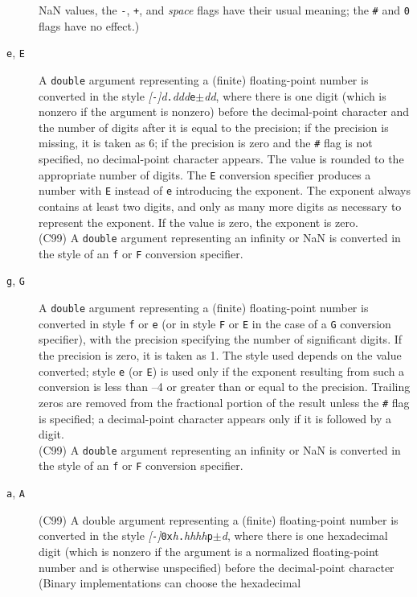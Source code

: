 \begin{description}
NaN values, the \texttt{-}, \texttt{+}, and \emph{space} flags have their usual
meaning; the \texttt{\#} and \texttt{0} flags have no effect.)
	\item[\texttt{e}, \texttt{E}] A \texttt{double} argument representing a
(finite) floating-point number is converted in the style
\emph{[}\texttt{-}\emph{]d}\texttt{.}\emph{ddd}\texttt{e$\pm$}\emph{dd},
where there is one digit (which is nonzero if the argument is nonzero) before
the decimal-point character and the number of digits after it is equal to the
precision; if the precision is missing, it is taken as 6; if the precision is
zero and the \texttt{\#} flag is not specified, no decimal-point character
appears. The value is rounded to the appropriate number of digits. The
\texttt{E} conversion specifier produces a number with \texttt{E} instead of
\texttt{e} introducing the exponent. The exponent always contains at least two
digits, and only as many more digits as necessary to represent the exponent. If
the value is zero, the exponent is zero.\\(C99) A \texttt{double} argument
representing an infinity or NaN is converted in the style of an \texttt{f} or
\texttt{F} conversion specifier.
	\item[\texttt{g}, \texttt{G}] A \texttt{double} argument representing a
(finite) floating-point number is converted in style \texttt{f} or \texttt{e}
(or in style \texttt{F} or \texttt{E} in the case of a \texttt{G} conversion
specifier), with the precision specifying the number of significant digits. If
the precision is zero, it is taken as 1. The style used depends on the value
converted; style \texttt{e} (or \texttt{E}) is used only if the exponent
resulting from such a conversion is less than --4 or greater than or equal to
the precision. Trailing zeros are removed from the fractional portion of the
result unless the \texttt{\#} flag is specified; a decimal-point character
appears only if it is followed by a digit.\\(C99) A \texttt{double} argument
representing an infinity or NaN is converted in the style of an \texttt{f} or
\texttt{F} conversion specifier.
	\item[\texttt{a}, \texttt{A}] (C99) A double argument representing a
(finite) floating-point number is converted in the style
\emph{[}\texttt{-}\emph{]}\texttt{0x}\emph{h}\texttt{.}\emph{hhhh}\texttt{p$\pm$}\emph{d},
where there is one hexadecimal digit (which is nonzero if the argument is a
normalized floating-point number and is otherwise unspecified) before the
decimal-point character (Binary implementations can choose the hexadecimal

\end{description}
